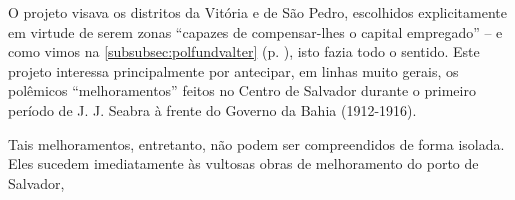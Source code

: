 O projeto visava os distritos da Vitória e de São Pedro, escolhidos explicitamente em virtude de serem zonas ``capazes de compensar-lhes o capital empregado'' \cite[p.~95]{CUNHA2011} -- e como vimos na \autoref{subsubsec:polfundvalter} (p. \pageref{subsubsec:polfundvalter}), isto fazia todo o sentido. Este projeto interessa principalmente por antecipar, em linhas muito gerais, os polêmicos ``melhoramentos'' feitos no Centro de Salvador durante o primeiro período de J. J. Seabra à frente do Governo da Bahia (1912-1916).

Tais melhoramentos, entretanto, não podem ser compreendidos de forma isolada. Eles sucedem imediatamente às vultosas obras de melhoramento do porto de Salvador, 